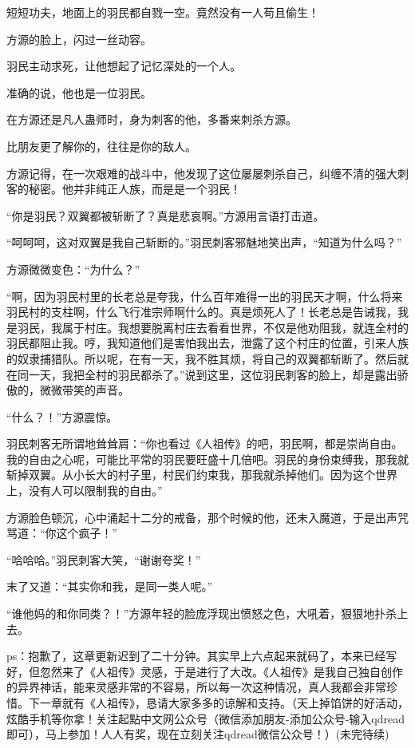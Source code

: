 \begin{this_body}
短短功夫，地面上的羽民都自戮一空。竟然没有一人苟且偷生！

方源的脸上，闪过一丝动容。

羽民主动求死，让他想起了记忆深处的一个人。

准确的说，他也是一位羽民。

在方源还是凡人蛊师时，身为刺客的他，多番来刺杀方源。

比朋友更了解你的，往往是你的敌人。

方源记得，在一次艰难的战斗中，他发现了这位屡屡刺杀自己，纠缠不清的强大刺客的秘密。他并非纯正人族，而是是一个羽民！

“你是羽民？双翼都被斩断了？真是悲哀啊。”方源用言语打击道。

“呵呵呵，这对双翼是我自己斩断的。”羽民刺客邪魅地笑出声，“知道为什么吗？”

方源微微变色：“为什么？”

“啊，因为羽民村里的长老总是夸我，什么百年难得一出的羽民天才啊，什么将来羽民村的支柱啊，什么飞行准宗师啊什么的。真是烦死人了！长老总是告诫我，我是羽民，我属于村庄。我想要脱离村庄去看看世界，不仅是他劝阻我，就连全村的羽民都阻止我。哼，我知道他们是害怕我出去，泄露了这个村庄的位置，引来人族的奴隶捕猎队。所以呢，在有一天，我不胜其烦，将自己的双翼都斩断了。然后就在同一天，我把全村的羽民都杀了。”说到这里，这位羽民刺客的脸上，却是露出骄傲的，微微带笑的声音。

“什么？！”方源震惊。

羽民刺客无所谓地耸耸肩：“你也看过《人祖传》的吧，羽民啊，都是崇尚自由。我的自由之心呢，可能比平常的羽民要旺盛十几倍吧。羽民的身份束缚我，那我就斩掉双翼。从小长大的村子里，村民们约束我，那我就杀掉他们。因为这个世界上，没有人可以限制我的自由。”

方源脸色顿沉，心中涌起十二分的戒备，那个时候的他，还未入魔道，于是出声咒骂道：“你这个疯子！”

“哈哈哈。”羽民刺客大笑，“谢谢夸奖！”

末了又道：“其实你和我，是同一类人呢。”

“谁他妈的和你同类？！”方源年轻的脸庞浮现出愤怒之色，大吼着，狠狠地扑杀上去。

ps：抱歉了，这章更新迟到了二十分钟。其实早上六点起来就码了，本来已经写好，但忽然来了《人祖传》灵感，于是进行了大改。《人祖传》是我自己独自创作的异界神话，能来灵感非常的不容易，所以每一次这种情况，真人我都会非常珍惜。下一章就有《人祖传》，恳请大家多多的谅解和支持。（天上掉馅饼的好活动，炫酷手机等你拿！关注起點中文网公众号（微信添加朋友-添加公众号-输入qdread即可），马上参加！人人有奖，现在立刻关注qdread微信公众号！）(未完待续)

\end{this_body}

